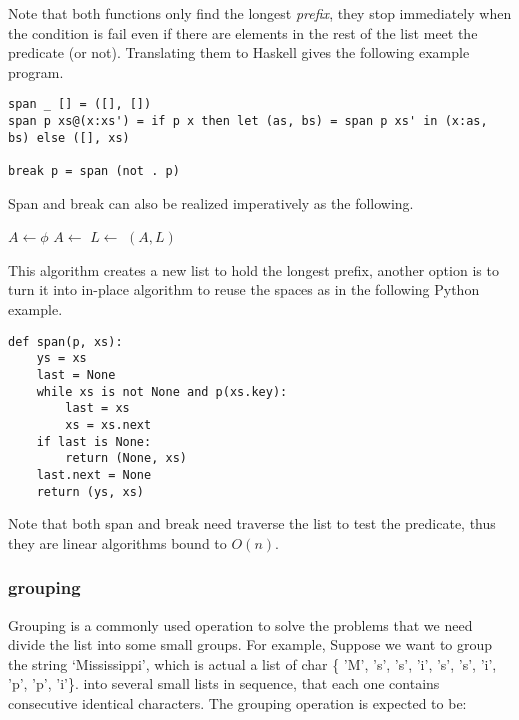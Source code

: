 \documentclass[b5paper]{article}
\begin{document}
Note that both functions only find the longest {\em prefix}, they stop immediately when the condition
is fail even if there are elements in the rest of the list meet the predicate (or not). Translating them
to Haskell gives the following example program.

\lstset{language=Haskell}
\begin{lstlisting}
span _ [] = ([], [])
span p xs@(x:xs') = if p x then let (as, bs) = span p xs' in (x:as, bs) else ([], xs)

break p = span (not . p)
\end{lstlisting}

Span and break can also be realized imperatively as the following.

\begin{algorithmic}[1]
  \State $A \gets \phi$
    \State $A \gets $ 
    \State $L \gets $ 
  \EndWhile
  \State \Return $(A, L)$
\EndFunction
\Statex
{}
  \State \Return {}
\EndFunction
\end{algorithmic}

This algorithm creates a new list to hold the longest prefix, another option is to turn it
into in-place algorithm to reuse the spaces as in the following Python example.

\lstset{language=Python}
\begin{lstlisting}
def span(p, xs):
    ys = xs
    last = None
    while xs is not None and p(xs.key):
        last = xs
        xs = xs.next
    if last is None:
        return (None, xs)
    last.next = None
    return (ys, xs)
\end{lstlisting}

Note that both span and break need traverse the list to test the predicate, thus they are linear
algorithms bound to $O(n)$.

\subsubsection{grouping}
Grouping is a commonly used operation to solve the problems that we need divide the list into some small groups.
For example, Suppose we want to group the
string `Mississippi', which is actual a list of char \{ 'M', 's', 's', 'i', 's', 's', 'i', 'p', 'p', 'i'\}.
into several small lists in sequence, that each one contains consecutive identical characters. The grouping
operation is expected to be:
\end{document}
